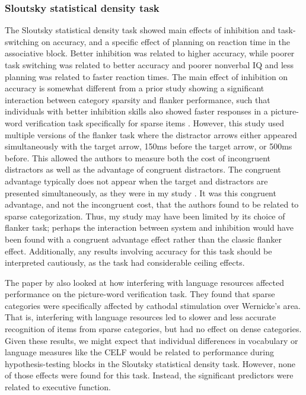 \documentclass[../dissertation.tex]{subfiles}
\begin{document}
\subsubsection{Sloutsky statistical density task}
	The Sloutsky statistical density task showed main effects of inhibition and task-switching on accuracy, and a specific effect of planning on reaction time in the associative block. Better inhibition was related to higher accuracy, while poorer task switching was related to better accuracy and poorer nonverbal IQ and less planning was related to faster reaction times. The main effect of inhibition on accuracy is somewhat different from a prior study showing a significant interaction between category sparsity and flanker performance, such that individuals with better inhibition skills also showed faster responses in a picture-word verification task specifically for sparse items \citep{Perry2016}. However, this study used multiple versions of the flanker task where the distractor arrows either appeared simultaneously with the target arrow, 150ms before the target arrow, or 500ms before. This allowed the authors to measure both the cost of incongruent distractors as well as the advantage of congruent distractors. The congruent advantage typically does not appear when the target and distractors are presented simultaneously, as they were in my study \citep{Botella2002}. It was this congruent advantage, and not the incongruent cost, that the authors found to be related to sparse categorization. Thus, my study may have been limited by its choice of flanker task; perhaps the interaction between system and inhibition would have been found with a congruent advantage effect rather than the classic flanker effect. Additionally, any results involving accuracy for this task should be interpreted cautiously, as the task had considerable ceiling effects. \par 
	The paper by \citet{Perry2016} also looked at how interfering with language resources affected performance on the picture-word verification task. They found that sparse categories were specifically affected by cathodal stimulation over Wernicke's area. That is, interfering with language resources led to slower and less accurate recognition of items from sparse categories, but had no effect on dense categories. Given these results, we might expect that individual differences in vocabulary or language measures like the CELF would be related to performance during hypothesis-testing blocks in the Sloutsky statistical density task. However, none of those effects were found for this task. Instead, the significant predictors were related to executive function. \par 
\end{document}
